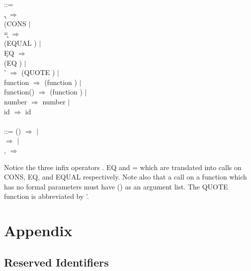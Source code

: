 \documentclass[11pt,letterpaper]{book}
\begin{document}
\begin{tabbing}
 ::= \\
\>  \k{.}  $\Longrightarrow$ \\
\> \> (CONS   $\mid$ \\
\>  \k{=}   $\Longrightarrow$ \\
\> \> (EQUAL  ) $\mid$ \\
\>  \k{EQ}  $\Longrightarrow$ \\
\> \> (EQ  ) $\mid$ \\
\> ' $\Longrightarrow$ (QUOTE ) $\mid$ \\
\> function  $\Longrightarrow$ (function )
$\mid$ \\
\> function() $\Longrightarrow$ (function )
$\mid$ \\
\>  number $\Longrightarrow$ number $\mid$ \\
\> id $\Longrightarrow$ id \\ \\

 ::= () $\Longrightarrow$ $\mid$ \\
\>  $\Longrightarrow$  $\mid$ \\
\> ,  $\Longrightarrow$ 
\end{tabbing}

Notice the three infix operators .  EQ and = which are translated into
calls on CONS, EQ, and EQUAL respectively.  Note also that a call on a
function which has no formal parameters must have () as an argument
list.  The QUOTE function is abbreviated by '.
%
%




\part{Appendix}
\appendix
\chapter{Reserved Identifiers}
\end{document}
